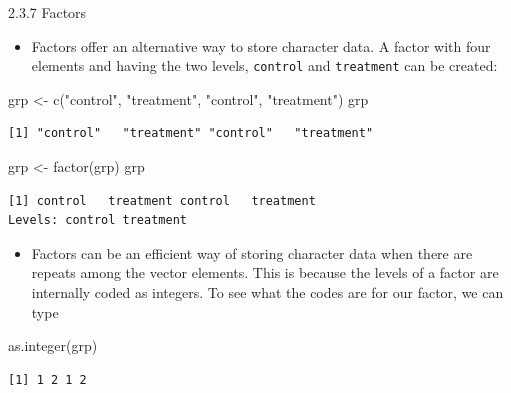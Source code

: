 \documentclass[
  9pt,
  a4paper,
  ignorenonframetext,
  notheorems]{beamer}
\newenvironment{Shaded}{\begin{snugshade}}{\end{snugshade}}
\newcommand{\FunctionTok}[1]{\textcolor[rgb]{0.28,0.35,0.67}{#1}}
\newcommand{\NormalTok}[1]{\textcolor[rgb]{0.00,0.23,0.31}{#1}}
\newcommand{\OtherTok}[1]{\textcolor[rgb]{0.00,0.23,0.31}{#1}}
\newcommand{\StringTok}[1]{\textcolor[rgb]{0.13,0.47,0.30}{#1}}
\providecommand{\tightlist}{%
  \setlength{\itemsep}{0pt}\setlength{\parskip}{0pt}}\usepackage{longtable,booktabs,array}
\begin{document}
\begin{frame}[fragile]{2.3.7 Factors}
\protect\hypertarget{factors}{}
\begin{itemize}
\tightlist
\item
  Factors offer an alternative way to store character data. A factor
  with four elements and having the two levels, \texttt{control} and
  \texttt{treatment} can be created:
\end{itemize}

\begin{Shaded}
\begin{Highlighting}[]
\NormalTok{grp }\OtherTok{\textless{}{-}} \FunctionTok{c}\NormalTok{(}\StringTok{"control"}\NormalTok{, }\StringTok{"treatment"}\NormalTok{, }\StringTok{"control"}\NormalTok{, }\StringTok{"treatment"}\NormalTok{) }
\NormalTok{grp}
\end{Highlighting}
\end{Shaded}

\begin{verbatim}
[1] "control"   "treatment" "control"   "treatment"
\end{verbatim}

\begin{Shaded}
\begin{Highlighting}[]
\NormalTok{grp }\OtherTok{\textless{}{-}} \FunctionTok{factor}\NormalTok{(grp) }
\NormalTok{grp}
\end{Highlighting}
\end{Shaded}

\begin{verbatim}
[1] control   treatment control   treatment
Levels: control treatment
\end{verbatim}

\begin{itemize}
\tightlist
\item
  Factors can be an efficient way of storing character data when there
  are repeats among the vector elements. This is because the levels of a
  factor are internally coded as integers. To see what the codes are for
  our factor, we can type
\end{itemize}

\begin{Shaded}
\begin{Highlighting}[]
\FunctionTok{as.integer}\NormalTok{(grp)}
\end{Highlighting}
\end{Shaded}

\begin{verbatim}
[1] 1 2 1 2
\end{verbatim}
\end{frame}
\end{document}
